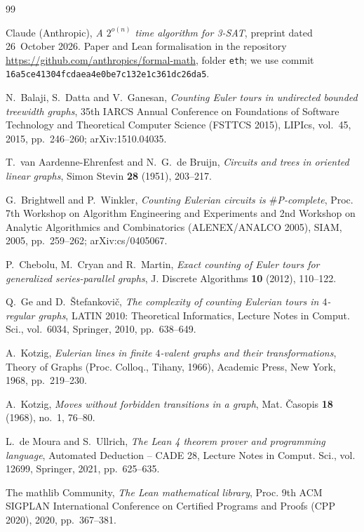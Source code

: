 \documentclass[10pt]{amsart}
\theoremstyle{plain}
\theoremstyle{definition}
\theoremstyle{remark}
\numberwithin{equation}{section}
\begin{document}
\begin{thebibliography}{99}

Claude (Anthropic), \emph{A $2^{o(n)}$ time algorithm for {3-SAT}}, preprint dated 26~October 2026.
Paper and Lean formalisation in the repository \url{https://github.com/anthropics/formal-math}, folder
\texttt{eth}; we use commit \texttt{16a5ce41304fcdaea4e0be7c132e1c361dc26da5}.

N.~Balaji, S.~Datta and V.~Ganesan, \emph{Counting {E}uler tours in undirected bounded treewidth
graphs}, 35th IARCS Annual Conference on Foundations of Software Technology and Theoretical Computer
Science (FSTTCS 2015), LIPIcs, vol.~45, 2015, pp.~246--260; arXiv:1510.04035.

T.~van Aardenne-Ehrenfest and N.~G.~de Bruijn, \emph{Circuits and trees in oriented linear graphs},
Simon Stevin \textbf{28} (1951), 203--217.

G.~Brightwell and P.~Winkler, \emph{Counting {E}ulerian circuits is $\#${P}-complete}, Proc. 7th
Workshop on Algorithm Engineering and Experiments and 2nd Workshop on Analytic Algorithmics and
Combinatorics (ALENEX/ANALCO 2005), SIAM, 2005, pp.~259--262; arXiv:cs/0405067.

P.~Chebolu, M.~Cryan and R.~Martin, \emph{Exact counting of {E}uler tours for generalized
series-parallel graphs}, J. Discrete Algorithms \textbf{10} (2012), 110--122.

Q.~Ge and D.~\v{S}tefankovi\v{c}, \emph{The complexity of counting {E}ulerian tours in $4$-regular
graphs}, LATIN 2010: Theoretical Informatics, Lecture Notes in Comput. Sci., vol.~6034, Springer,
2010, pp.~638--649.

A.~Kotzig, \emph{Eulerian lines in finite $4$-valent graphs and their transformations}, Theory of
Graphs (Proc. Colloq., Tihany, 1966), Academic Press, New York, 1968, pp.~219--230.

A.~Kotzig, \emph{Moves without forbidden transitions in a graph}, Mat. \v{C}asopis \textbf{18}
(1968), no.~1, 76--80.

L.~de Moura and S.~Ullrich, \emph{The {L}ean 4 theorem prover and programming language}, Automated
Deduction -- CADE 28, Lecture Notes in Comput. Sci., vol. 12699, Springer, 2021, pp.~625--635.

The mathlib Community, \emph{The {L}ean mathematical library}, Proc. 9th ACM SIGPLAN International
Conference on Certified Programs and Proofs (CPP 2020), 2020, pp.~367--381.


\end{thebibliography}
\end{document}
